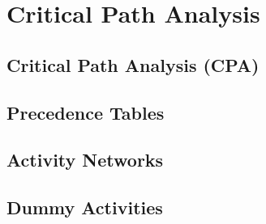 \documentclass[../maths.tex]{subfiles}
\begin{document}
\chapter{Critical Path Analysis}
\section{Critical Path Analysis (CPA)}
\section{Precedence Tables}
\section{Activity Networks}
\section{Dummy Activities}
\end{document}
